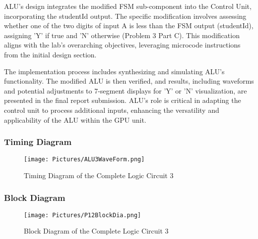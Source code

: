 
        {ALU's design integrates the modified FSM sub-component into the Control Unit, incorporating the studentId output. The specific modification involves assessing whether one of the two digits of input A is less than the FSM output (studentId), assigning 'Y' if true and 'N' otherwise (Problem 3 Part C). This modification aligns with the lab's overarching objectives, leveraging microcode instructions from the initial design section.}

        {The implementation process includes synthesizing and simulating ALU's functionality. The modified ALU is then verified, and results, including waveforms and potential adjustments to 7-segment displays for 'Y' or 'N' visualization, are presented in the final report submission. ALU's role is critical in adapting the control unit to process additional inputs, enhancing the versatility and applicability of the ALU within the GPU unit.}
    
    \subsubsection{{Timing Diagram}}

    \begin{figure}[H]
        \centering
        \texttt{[image: Pictures/ALU3WaveForm.png]}
        \caption{{Timing Diagram of the Complete Logic Circuit 3}}
        \label{}
    \end{figure}

    \subsubsection{{Block Diagram}}

        \begin{figure}[H]
            \centering
            \texttt{[image: Pictures/P12BlockDia.png]}
            \caption{{Block Diagram of the Complete Logic Circuit 3}}
            \label{}
        \end{figure}



